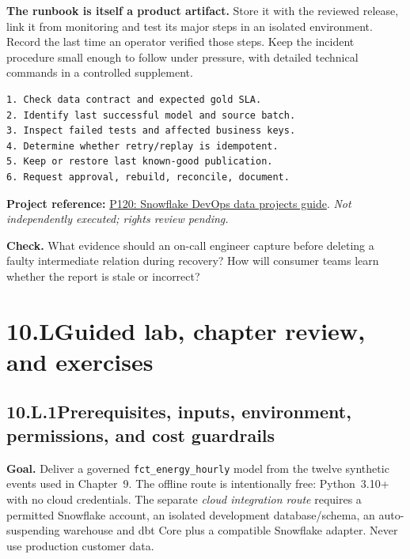 \documentclass[11pt,twoside]{article}
\newcommand{\topic}[2]{\subsection*{#1\quad #2}}
\newcommand{\repo}[2]{\par\begingroup\fontsize{8.0}{9.6}\selectfont\sffamily\color{inkgray}\textbf{Project reference:} \href{#2}{#1}. \textit{Not independently executed; rights review pending.}\par\endgroup}
\begin{document}
\textbf{The runbook is itself a product artifact.} Store it with the reviewed release, link it from monitoring and test its major steps in an isolated environment. Record the last time an operator verified those steps. Keep the incident procedure small enough to follow under pressure, with detailed technical commands in a controlled supplement.
\begin{lstlisting}[caption={Operator's quick triage, in order.}]
1. Check data contract and expected gold SLA.
2. Identify last successful model and source batch.
3. Inspect failed tests and affected business keys.
4. Determine whether retry/replay is idempotent.
5. Keep or restore last known-good publication.
6. Request approval, rebuild, reconcile, document.
\end{lstlisting}
\repo{P120: Snowflake DevOps data projects guide}{https://github.com/Snowflake-Labs/sfguide-getting-started-with-devops-data-projects-in-snowflake}
\textbf{Check.} What evidence should an on-call engineer capture before deleting a faulty intermediate relation during recovery? How will consumer teams learn whether the report is stale or incorrect?
\newpage
\section*{10.L\quad Guided lab, chapter review, and exercises}
\topic{10.L.1}{Prerequisites, inputs, environment, permissions, and cost guardrails}
\textbf{Goal.} Deliver a governed \texttt{fct\_energy\_hourly} model from the twelve synthetic events used in Chapter~9. The offline route is intentionally free: Python~3.10+ with no cloud credentials. The separate \emph{cloud integration route} requires a permitted Snowflake account, an isolated development database/schema, an auto-suspending warehouse and dbt Core plus a compatible Snowflake adapter. Never use production customer data.
\end{document}
